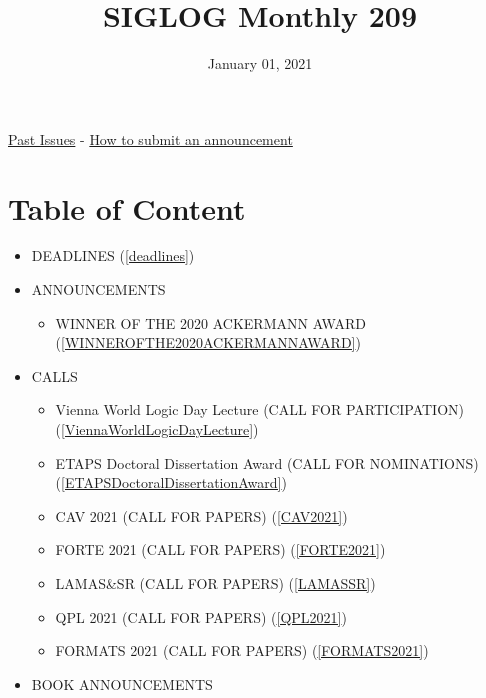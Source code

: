 \documentclass{article}
\begin{document}
\title{SIGLOG Monthly 209}\date{January 01, 2021}\maketitle


\href{https://lics.siglog.org/newsletters/}{Past Issues}
 - 
\href{https://lics.siglog.org/newsletters/inst.html}{How to submit an announcement}
\section{Table of Content}\begin{itemize}\item DEADLINES (\cref{deadlines}) 
 
\item ANNOUNCEMENTS 
 
\begin{itemize}\item WINNER OF THE 2020 ACKERMANN AWARD (\cref{WINNEROFTHE2020ACKERMANNAWARD})
\end{itemize} 
\item CALLS 
 
\begin{itemize}\item Vienna World Logic Day Lecture (CALL FOR PARTICIPATION) (\cref{ViennaWorldLogicDayLecture})
\item ETAPS Doctoral Dissertation Award (CALL FOR NOMINATIONS) (\cref{ETAPSDoctoralDissertationAward})
\item CAV 2021 (CALL FOR PAPERS) (\cref{CAV2021})
\item FORTE 2021 (CALL FOR PAPERS) (\cref{FORTE2021})
\item LAMAS\&SR (CALL FOR PAPERS) (\cref{LAMASSR})
\item QPL 2021 (CALL FOR PAPERS) (\cref{QPL2021})
\item FORMATS 2021 (CALL FOR PAPERS) (\cref{FORMATS2021})
\end{itemize} 
\item BOOK ANNOUNCEMENTS 
 

\end{itemize}
\end{document}
